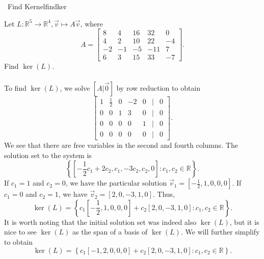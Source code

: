         \begin{example}{\Difficulty\,\Difficulty\,\,Find Kernel}{findker}

            Let \(L:\mathbb{R}^5\to\mathbb{R}^4,\vec{v}\mapsto A\vec{v}\), where
            \begin{equation*}
                A=\begin{bmatrix}
                    8 & 4 & 16 & 32 & 0 \\
                    4 & 2 & 10 & 22 & -4 \\
                    -2 & -1 & -5 & -11 & 7 \\
                    6 & 3 & 15 & 33 & -7
                \end{bmatrix}.
            \end{equation*}
            Find \(\ker(L)\).
            \\
            \\
            To find \(\ker(L)\), we solve \([A|\vec{0}]\) by row reduction to obtain
            \begin{equation*}
                \begin{bmatrix}
                    1 & \frac{1}{2} & 0 & -2 & 0 & | & 0 \\
                    0 & 0 & 1 & 3 & 0 & | & 0 \\
                    0 & 0 & 0 & 0 & 1 & | & 0 \\
                    0 & 0 & 0 & 0 & 0 & | & 0 
                \end{bmatrix}.
            \end{equation*}
            We see that there are free variables in the second and fourth columns. The solution set to the system is
            \begin{equation*}
                \left\{\left[-\frac{1}{2}c_1+2c_2,c_1,-3c_2,c_2,0\right]:c_1,c_2\in\mathbb{R}\right\}.
            \end{equation*}
            If \(c_1=1\) and \(c_2=0\), we have the particular solution \(\vec{v}_1=[-\frac{1}{2},1,0,0,0]\). If \(c_1=0\) and \(c_2=1\), we have \(\vec{v}_2=[2,0,-3,1,0]\). Thus,
            \begin{equation*}
                \ker(L)=\left\{c_1\left[-\frac{1}{2},1,0,0,0\right]+c_2[2,0,-3,1,0]:c_1,c_2\in\mathbb{R}\right\}.
            \end{equation*}
            It is worth noting that the initial solution set was indeed also \(\ker(L)\), but it is nice to see \(\ker(L)\) as the span of a basis of \(\ker(L)\). We will further simplify to obtain
            \begin{equation*}
                \ker(L)=\left\{c_1\left[-1,2,0,0,0\right]+c_2[2,0,-3,1,0]:c_1,c_2\in\mathbb{R}\right\}.
            \end{equation*}

        \end{example}
